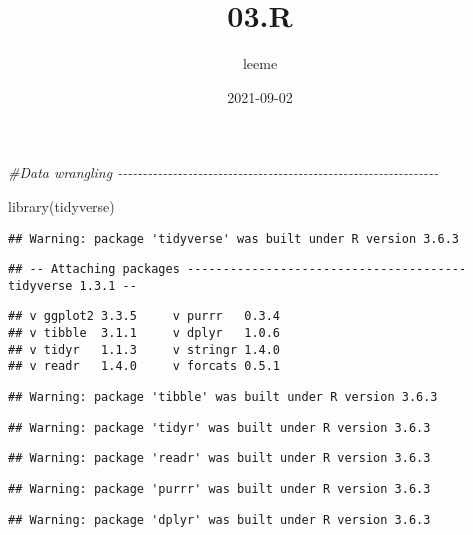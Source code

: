 \documentclass[
]{article}
\title{03.R}
\author{leeme}
\date{2021-09-02}
\newenvironment{Shaded}{\begin{snugshade}}{\end{snugshade}}
\newcommand{\CommentTok}[1]{\textcolor[rgb]{0.56,0.35,0.01}{\textit{#1}}}
\newcommand{\FunctionTok}[1]{\textcolor[rgb]{0.00,0.00,0.00}{#1}}
\newcommand{\NormalTok}[1]{#1}
\begin{document}
\maketitle

\begin{Shaded}
\begin{Highlighting}[]
\CommentTok{\#Data wrangling {-}{-}{-}{-}{-}{-}{-}{-}{-}{-}{-}{-}{-}{-}{-}{-}{-}{-}{-}{-}{-}{-}{-}{-}{-}{-}{-}{-}{-}{-}{-}{-}{-}{-}{-}{-}{-}{-}{-}{-}{-}{-}{-}{-}{-}{-}{-}{-}{-}{-}{-}{-}{-}{-}{-}{-}{-}{-}{-}{-}{-}{-}{-}{-}}

\FunctionTok{library}\NormalTok{(tidyverse)}
\end{Highlighting}
\end{Shaded}

\begin{verbatim}
## Warning: package 'tidyverse' was built under R version 3.6.3
\end{verbatim}

\begin{verbatim}
## -- Attaching packages --------------------------------------- tidyverse 1.3.1 --
\end{verbatim}

\begin{verbatim}
## v ggplot2 3.3.5     v purrr   0.3.4
## v tibble  3.1.1     v dplyr   1.0.6
## v tidyr   1.1.3     v stringr 1.4.0
## v readr   1.4.0     v forcats 0.5.1
\end{verbatim}

\begin{verbatim}
## Warning: package 'tibble' was built under R version 3.6.3
\end{verbatim}

\begin{verbatim}
## Warning: package 'tidyr' was built under R version 3.6.3
\end{verbatim}

\begin{verbatim}
## Warning: package 'readr' was built under R version 3.6.3
\end{verbatim}

\begin{verbatim}
## Warning: package 'purrr' was built under R version 3.6.3
\end{verbatim}

\begin{verbatim}
## Warning: package 'dplyr' was built under R version 3.6.3
\end{verbatim}
\end{document}
